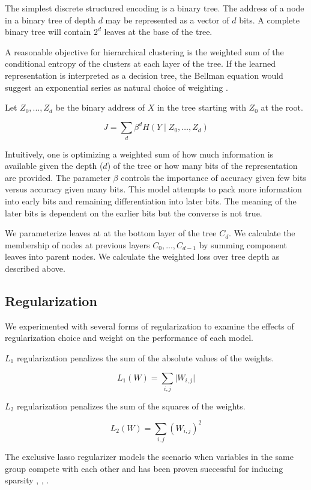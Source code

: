 \documentclass[11pt,letterpaper]{article}
\begin{document}
The simplest discrete structured encoding is a binary tree. The address of a node in a binary tree of depth $d$ may be represented as a vector of $d$ bits. A complete binary tree will contain $2^d$ leaves at the base of the tree.

A reasonable objective for hierarchical clustering is the weighted sum of the conditional entropy of the clusters at each layer of the tree. If the learned representation is interpreted as a decision tree, the Bellman equation would suggest an exponential series as natural choice of weighting \cite{bellman1954}.

Let $Z_0,...,Z_d$ be the binary address of $X$ in the tree starting with $Z_0$ at the root.

$$ J = \sum_d \beta ^ d  H(Y \mid Z_0,\ldots, Z_d) $$

Intuitively, one is optimizing a weighted sum of how much information is available given the depth ($d$) of the tree or how many bits of the representation are provided. The parameter $\beta$ controls the importance of accuracy given few bits versus accuracy given many bits. This model attempts to pack more information into early bits and remaining differentiation into later bits. The meaning of the later bits is dependent on the earlier bits but the converse is not true.

We parameterize leaves at at the bottom layer of the tree $C_d$. We calculate the membership of nodes at previous layers $C_0,...,C_{d-1}$ by summing component leaves into parent nodes. We calculate the weighted loss over tree depth as described above.

\subsection{Regularization}

We experimented with several forms of regularization to examine the effects of regularization choice and weight on the performance of each model.

$L_1$ regularization penalizes the sum of the absolute values of the weights.

$$L_1(W) = \sum_{i,j} \lvert W_{i,j} \rvert $$

$L_2$ regularization penalizes the sum of the squares of the weights.

$$L_2(W) = \sum_{i,j} (W_{i,j})^2 $$

The exclusive lasso regularizer models the scenario when variables in the same group compete with each other and has been proven successful for inducing sparsity
\cite{zhou10a}, 
\cite{bach2012},
 \cite{Campbell15}.
\end{document}
